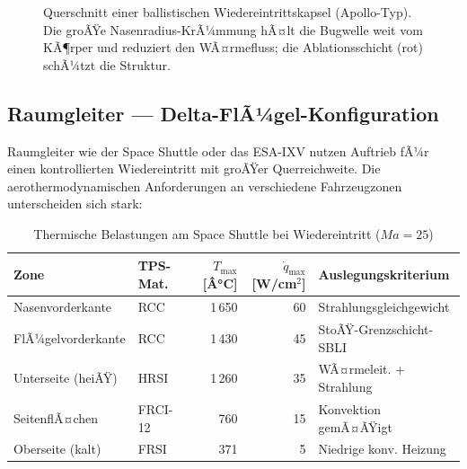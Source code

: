 ﻿\documentclass[12pt,a4paper]{article}
\newcommand{\Ma}{M\!a}
\begin{document}
\begin{figure}[H]
\caption{Querschnitt einer ballistischen Wiedereintrittskapsel (Apollo-Typ).
Die groÃŸe Nasenradius-KrÃ¼mmung hÃ¤lt die Bugwelle weit vom KÃ¶rper und reduziert
den WÃ¤rmefluss; die Ablationsschicht (rot) schÃ¼tzt die Struktur.}
\label{fig:kapsel}
\end{figure}

\subsection{Raumgleiter --- Delta-FlÃ¼gel-Konfiguration}

Raumgleiter wie der Space Shuttle oder das ESA-IXV nutzen Auftrieb fÃ¼r einen
kontrollierten Wiedereintritt mit groÃŸer Querreichweite. Die aerothermodynamischen
Anforderungen an verschiedene Fahrzeugzonen unterscheiden sich stark:

\begin{table}[H]
\centering
\caption{Thermische Belastungen am Space Shuttle bei Wiedereintritt ($\Ma=25$)}
\label{tab:shuttle_zonen}
\begin{tabular}{llrrl}
\toprule
\textbf{Zone} & \textbf{TPS-Mat.} & $T_{\max}$ [Â°C] & $\dot{q}_{\max}$ [W/cm$^2$] & \textbf{Auslegungskriterium}\\
\midrule
Nasenvorderkante   & RCC          & 1\,650 & 60  & Strahlungsgleichgewicht\\
FlÃ¼gelvorderkante         & RCC          & 1\,430 & 45  & StoÃŸ-Grenzschicht-SBLI\\
Unterseite (heiÃŸ)         & HRSI  & 1\,260 & 35  & WÃ¤rmeleit. + Strahlung\\
SeitenflÃ¤chen             & FRCI-12      & 760    & 15  & Konvektion gemÃ¤ÃŸigt\\
Oberseite (kalt)          & FRSI         & 371    & 5   & Niedrige konv. Heizung\\
\bottomrule
\end{tabular}
\end{table}
\end{document}
